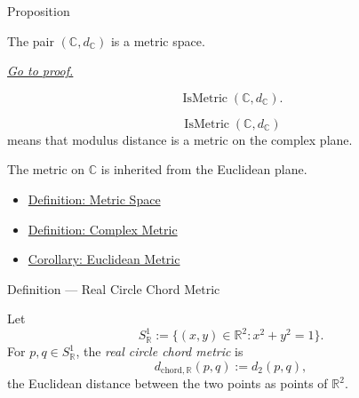 \begin{propositionbox}{Proposition}
\begin{proposition}
\label{prop:complex-plane-metric-space}
The pair \((\mathbb{C},d_{\mathbb{C}})\) is a metric space.

\smallskip
\noindent
\hyperref[prf:complex-plane-metric-space]{\textit{Go to proof.}}
\end{proposition}
\end{propositionbox}

\begin{remark*}
\[
  \operatorname{IsMetric}(\mathbb{C},d_{\mathbb{C}}).
\]
\end{remark*}

\begin{remark*}
\[
\operatorname{IsMetric}(\mathbb{C},d_{\mathbb{C}})
\]
means that modulus distance is a metric on the complex plane.
\end{remark*}

\begin{remark*}[Interpretation]
The metric on \(\mathbb{C}\) is inherited from the Euclidean plane.
\end{remark*}


\begin{dependencies}
\begin{itemize}
  \item \hyperref[def:metric-space]{Definition: Metric Space}
  \item \hyperref[def:complex-metric]{Definition: Complex Metric}
  \item \hyperref[cor:euclidean-metric]{Corollary: Euclidean Metric}
\end{itemize}
\end{dependencies}

\begin{definitionbox}{Definition --- Real Circle Chord Metric}
\begin{definition}\label{def:real-circle-chord-metric}
Let
\[
  S^1_{\mathbb{R}}
  :=
  \{(x,y)\in\mathbb{R}^2 : x^2+y^2=1\}.
\]
For \(p,q\in S^1_{\mathbb{R}}\), the \emph{real circle chord metric} is
\[
  d_{\mathrm{chord},\mathbb{R}}(p,q):=d_2(p,q),
\]
the Euclidean distance between the two points as points of \(\mathbb{R}^2\).
\end{definition}
\end{definitionbox}


